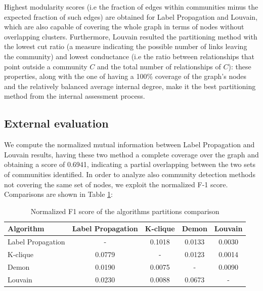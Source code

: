\documentclass[sigchi]{acmart}
\begin{document}
Highest modularity scores (i.e  the fraction of edges within communities minus the expected fraction of
such edges) are obtained for Label Propagation and Louvain, which are also capable of covering the whole graph in terms of nodes without overlapping clusters. Furthermore, Louvain resulted the partitioning method with the lowest cut ratio (a measure indicating the possible number of links leaving the community) and lowest conductance (i.e the ratio between relationships that point outside a community $C$ and the total number of relationships of $C$): these properties, along with the one of  having a 100\% coverage of the graph's nodes and the relatively balanced average internal degree, make it the best partitioning method from the internal assessment process.

\subsection{External evaluation}
We compute the normalized mutual information between Label Propagation and Louvain results, having these two method a complete coverage over the graph and obtaining a score of 0.6941, indicating a partial overlapping between the two sets of communities identified. In order to analyze also community detection methods not covering the same set of nodes, we exploit the normalized F-1 score. Comparisons are shown in Table \ref{table:NF1}:

\renewcommand{\arraystretch}{1.3}
\begin{table}[H]
\begin{center}
\scriptsize
\begin{tabular}{ |l|c|c|c|c| } 
 \hline
 \textbf{Algorithm} & \textbf{Label Propagation} & \textbf{K-clique} & \textbf{Demon} & \textbf{Louvain}\\
 \hline
Label Propagation & - & 0.1018 & 0.0133 & 0.0030\\
 K-clique & 0.0779 & - & 0.0123 & 0.0014\\
 Demon &  0.0190 &0.0075& - & 0.0090\\
 Louvain & 0.0230 & 0.0088 & 0.0673 & -\\

 \hline
\end{tabular}
\end{center}
\caption{\label{table:NF1}Normalized F1 score of the algorithms partitions comparison}
\end{table}
\end{document}
